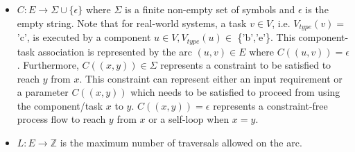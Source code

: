 \documentclass[12pt]{article}
\begin{document}
\begin{definition}
\begin{itemize}
\begin{itemize}
                    \item \begin{math}C : E \rightarrow \Sigma \cup \{\epsilon\} \end{math} where $\Sigma$ is a finite non-empty set of symbols and $\epsilon$ is the empty string. Note that for real-world systems, a task \begin{math}v \in V\end{math}, i.e. \begin{math}V_{type}(v) = \end{math}'c', is executed by a component \begin{math}u \in V, V_{type}(u) \in \end{math} \{'b','e'\}. This component-task association is represented by the arc \begin{math}(u, v) \in E \end{math} where \begin{math}C((u,v)) = \epsilon\end{math}. Furthermore, \begin{math}C((x,y)) \in \Sigma\end{math} represents a constraint to be satisfied to reach \begin{math}y\end{math} from \begin{math}x\end{math}. This constraint can represent either an input requirement or a parameter \begin{math}C((x,y))\end{math} which needs to be satisfied to proceed from using the component/task \begin{math}x\end{math} to \begin{math}y\end{math}. \begin{math}C((x,y)) = \epsilon\end{math} represents a constraint-free process flow to reach \begin{math}y\end{math} from \begin{math}x\end{math} or a self-loop when \begin{math}x = y\end{math}.
                    
                    \item \begin{math}L : E \rightarrow \mathbb{Z}\end{math} is the maximum number of traversals allowed on the arc.
                    

\end{itemize}
\end{itemize}
\end{definition}
\end{document}
